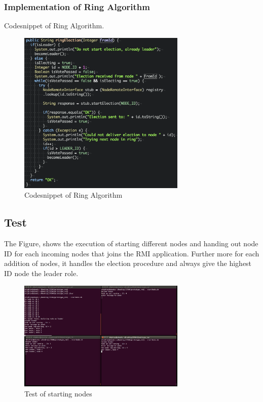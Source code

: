 \subsubsection{Implementation of Ring Algorithm}
Codesnippet of Ring Algorithm.

\begin{figure}[ht!]
\centering
\includegraphics[width=80mm]{img/ring_election_code.png}
\caption{Codesnippet of Ring Algorithm}
\label{Codesnippet of Ring Algorithm}
\end{figure}

\subsection{Test}

The Figure, shows the execution of starting different nodes and handing out node ID for each incoming nodes that joins the RMI application. Further more for each addition of nodes, it handles the election procedure and always give the highest ID node the leader role.

\begin{figure}[ht!]
\centering
\includegraphics[width=80mm]{img/starting_nodes.png}
\caption{Test of starting nodes}
\label{Test of starting Nodes}
\end{figure}

